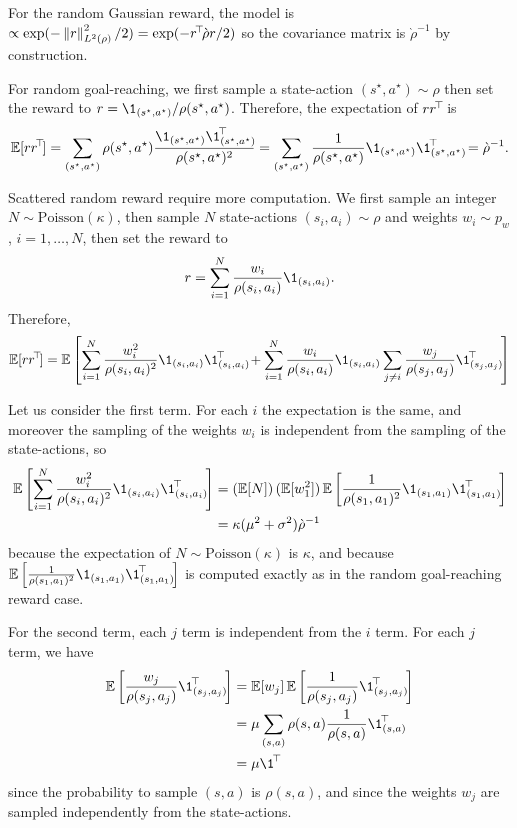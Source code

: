 \documentclass[11pt,a4paper]{article}
\newcommand{\drho}{\grave \rho}
\begin{document}
\begin{dem}
For the random Gaussian reward, the model is $\propto \exp
(-\norm{r}^2_{L^2(\rho)}/2)=\exp(-\transp{r}\drho r/2)$ so the covariance
matrix is $\drho^{-1}$ by construction.

For random goal-reaching, we first sample a state-action
$(s^\star,a^\star)\sim \rho$
then set the reward to $r=\1_{(s^\star,a^\star)}/\rho(s^\star,a^\star)$. Therefore, the expectation
of $rr^{\!\top}\!$ is
\begin{equation}
\E[r\transp{r}]=\sum_{(s^\star,a^\star)}
\rho(s^\star,a^\star)\frac{\1_{(s^\star,a^\star)}\transp{\1_{(s^\star,a^\star)}}}{\rho(s^\star,a^\star)^2}=\sum_{(s^\star,a^\star)}\frac{1}{\rho(s^\star,a^\star)}\1_{(s^\star,a^\star)}\transp{\1_{(s^\star,a^\star)}}=\drho^{-1}.
\end{equation}

Scattered random reward require more computation. We first sample an
integer $N\sim \mathrm{Poisson}(\kappa)$, then sample $N$ state-actions
$(s_i,a_i)\sim\rho$ and weights $w_i\sim p_w$, $i=1,\ldots,N$, then set
the reward to
\begin{equation}
r=\sum_{i=1}^N \frac{w_i}{\rho(s_i,a_i)} \1_{(s_i,a_i)}.
\end{equation}
Therefore,
\begin{equation}
\E[r\transp{r}]=\E\left[
\sum_{i=1}^N \frac{w_i^2}{\rho(s_i,a_i)^2}
\1_{(s_i,a_i)}\transp{\1_{(s_i,a_i)}}
+\sum_{i=1}^N\frac{w_i}{\rho(s_i,a_i)} \1_{(s_i,a_i)}
\sum_{j\neq i} \frac{w_j}{\rho(s_j,a_j)} \transp{\1_{(s_j,a_j)}}
\right]
\end{equation}

Let us consider the first term. For each $i$ the expectation is the same,
and moreover the sampling of the weights $w_i$ is independent from the
sampling of the state-actions, so
\begin{align}
\E
\left[
\sum_{i=1}^N \frac{w_i^2}{\rho(s_i,a_i)^2}
\1_{(s_i,a_i)}\transp{\1_{(s_i,a_i)}}
 \right]
&=(\E[N])\,(\E[w_1^2])\,\E\left[
\frac{1}{\rho(s_1,a_1)^2}
\1_{(s_1,a_1)}\transp{\1_{(s_1,a_1)}}
\right]
\\&=\kappa (\mu^2+\sigma^2) \drho^{-1}
\end{align}
because the expectation of $N\sim \mathrm{Poisson}(\kappa)$ is $\kappa$, and
because $\E\left[
\frac{1}{\rho(s_1,a_1)^2}
\1_{(s_1,a_1)}\transp{\1_{(s_1,a_1)}}
\right]$ is computed exactly as in the random goal-reaching reward case.

For the second term, each $j$ term is independent from the $i$ term. For
each $j$ term, we have
\begin{align}
\E\left[
\frac{w_j}{\rho(s_j,a_j)} \transp{\1_{(s_j,a_j)}}
\right]
&=\E[w_j]\,\E\left[\frac{1}{\rho(s_j,a_j)} \transp{\1_{(s_j,a_j)}}\right]
\\&=\mu \sum_{(s,a)} \rho(s,a) \frac{1}{\rho(s,a)} \transp{\1_{(s,a)}}
\\&=\mu\transp{\1}
\end{align}
since the probability to sample $(s,a)$ is $\rho(s,a)$, and since the
weights $w_j$ are sampled independently from the state-actions.


\end{dem}
\end{document}
